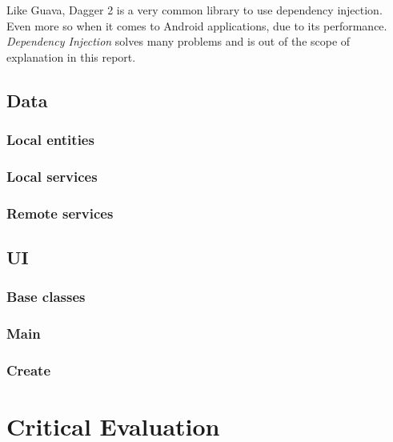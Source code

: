 \documentclass[english,a4paper,]{report}
\begin{document}
Like Guava, Dagger 2 is a very common library to use dependency
injection. Even more so when it comes to Android applications, due to
its performance. \emph{Dependency Injection} solves many problems and is
out of the scope of explanation in this report.

\hypertarget{data}{%
\section{Data}\label{data}}

\hypertarget{local-entities}{%
\subsection{Local entities}\label{local-entities}}

\hypertarget{local-services}{%
\subsection{Local services}\label{local-services}}

\hypertarget{remote-services}{%
\subsection{Remote services}\label{remote-services}}

\hypertarget{ui}{%
\section{UI}\label{ui}}

\hypertarget{base-classes}{%
\subsection{Base classes}\label{base-classes}}

\hypertarget{main}{%
\subsection{Main}\label{main}}

\hypertarget{create}{%
\subsection{Create}\label{create}}

\hypertarget{critical-evaluation}{%
\chapter{Critical Evaluation}\label{critical-evaluation}}
\end{document}
